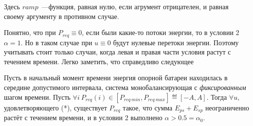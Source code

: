 Здесь $ramp$~---функция, равная нулю, если агрумент отрицателен, и равная своему аргументу в противном случае. 

Понятно, что при $P_{req} \equiv 0$, если были какие-то потоки энергии, то в условии 2 $\alpha = 1$. 
Но в таком случае при $u \equiv 0 $ будут нулевые перетоки энергии. 
Поэтому учитывать стоит только случаи, когда левая и правая части условия растут с течением времени.
Легко заметить, что справедливо следующее
\begin{Statement}
Пусть в начальный момент времени энергия опорной батареи находилась в середине допустимого интервала, система монобалансирующая с \textit{фиксированным} шагом времени.
Пусть $\forall i ~P_{req}(i) \in [P_{req~min}, P_{req~max}] \eqdef [-A, A]$. 
Тогда $\forall u$, удовлетворяющего (*), существует $P_{req}$ такое, что сумма $E_{ps} + E_{sp}$ неограниченно растёт с течением времени, и в условии 2 выполнено $\alpha > 0.5 = \alpha_0$.
\end{Statement}



